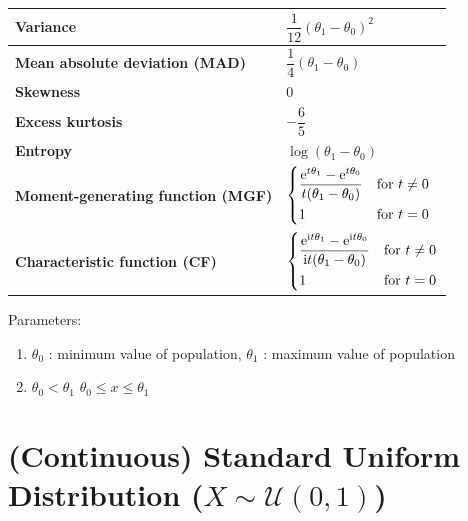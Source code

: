 \begin{customTableWrapper}{2}
\begin{longtable}{|m{6cm}|p{9cm}|}
    \textbf{Variance} &
    ${\displaystyle {\dfrac {1}{12}}(\theta_1-\theta_0)^{2}}$
    \\[1ex] \hline

    \textbf{Mean absolute deviation (MAD)} &
    ${\displaystyle {\dfrac {1}{4}}(\theta_1-\theta_0)}$
    \\[1ex] \hline

    \textbf{Skewness} &
    $0$
    \\ \hline

    \textbf{Excess kurtosis} &
    ${\displaystyle -{\dfrac {6}{5}}}$
    \\[1ex] \hline

    \textbf{Entropy} &
    ${\displaystyle \log(\theta_1-\theta_0)}$
    \\[1ex] \hline

    \textbf{Moment-generating function (MGF)} &
    ${\displaystyle {\begin{dcases}{\dfrac {\mathrm {e} ^{t\theta_1}-\mathrm {e} ^{t\theta_0}}{t(\theta_1-\theta_0)}}&{\text{for }}t\neq 0\\1&{\text{for }}t=0\end{dcases}}}$
    \\[1ex] \hline

    \textbf{Characteristic function (CF)} &
    ${\displaystyle {\begin{dcases}{\dfrac {\mathrm {e} ^{\mathrm {i} t\theta_1}-\mathrm {e} ^{\mathrm {i} t\theta_0}}{\mathrm {i} t(\theta_1-\theta_0)}}&{\text{for }}t\neq 0\\1&{\text{for }}t=0\end{dcases}}}$
    \\[1ex] \hline

\end{longtable}
\end{customTableWrapper}


Parameters:
\begin{enumerate}
    \item $\theta_0$ : minimum value of population, $\theta_1$ : maximum value of population

    \item 
        \hfill
        $\theta_0 < \theta_1$
        \hfill
        $\theta_0 \leq x \leq \theta_1$
        \hfill

\end{enumerate}



\section{(Continuous) Standard Uniform Distribution ($X \sim \mathcal{U}(0,1)$) \cite{ism-1}} \label{Standard Uniform Distribution}

